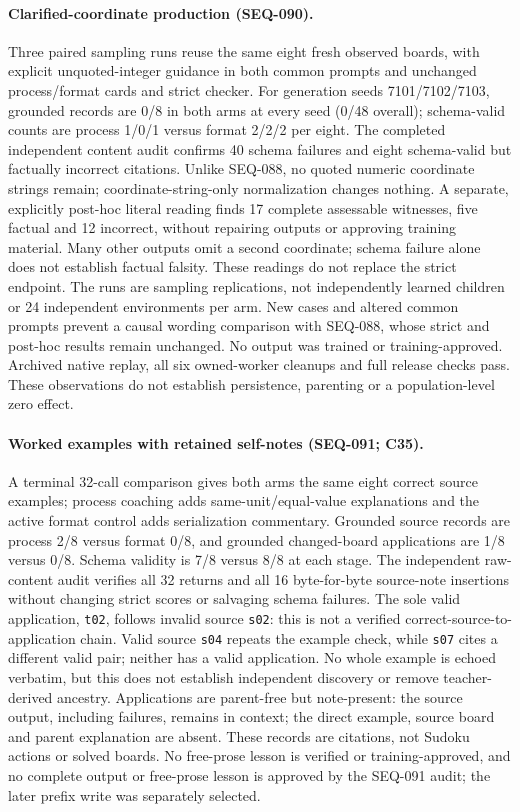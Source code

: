 \documentclass{article}
\begin{document}
\paragraph{Clarified-coordinate production (SEQ-090).} Three paired sampling runs reuse the same eight fresh observed boards, with explicit unquoted-integer guidance in both common prompts and unchanged process/format cards and strict checker. For generation seeds 7101/7102/7103, grounded records are 0/8 in both arms at every seed (0/48 overall); schema-valid counts are process 1/0/1 versus format 2/2/2 per eight. The completed independent content audit confirms 40 schema failures and eight schema-valid but factually incorrect citations. Unlike SEQ-088, no quoted numeric coordinate strings remain; coordinate-string-only normalization changes nothing. A separate, explicitly post-hoc literal reading finds 17 complete assessable witnesses, five factual and 12 incorrect, without repairing outputs or approving training material. Many other outputs omit a second coordinate; schema failure alone does not establish factual falsity. These readings do not replace the strict endpoint. The runs are sampling replications, not independently learned children or 24 independent environments per arm. New cases and altered common prompts prevent a causal wording comparison with SEQ-088, whose strict and post-hoc results remain unchanged. No output was trained or training-approved. Archived native replay, all six owned-worker cleanups and full release checks pass. These observations do not establish persistence, parenting or a population-level zero effect.

\paragraph{Worked examples with retained self-notes (SEQ-091; C35).} A terminal 32-call comparison gives both arms the same eight correct source examples; process coaching adds same-unit/equal-value explanations and the active format control adds serialization commentary. Grounded source records are process 2/8 versus format 0/8, and grounded changed-board applications are 1/8 versus 0/8. Schema validity is 7/8 versus 8/8 at each stage. The independent raw-content audit verifies all 32 returns and all 16 byte-for-byte source-note insertions without changing strict scores or salvaging schema failures. The sole valid application, \texttt{t02}, follows invalid source \texttt{s02}: this is not a verified correct-source-to-application chain. Valid source \texttt{s04} repeats the example check, while \texttt{s07} cites a different valid pair; neither has a valid application. No whole example is echoed verbatim, but this does not establish independent discovery or remove teacher-derived ancestry. Applications are parent-free but note-present: the source output, including failures, remains in context; the direct example, source board and parent explanation are absent. These records are citations, not Sudoku actions or solved boards. No free-prose lesson is verified or training-approved, and no complete output or free-prose lesson is approved by the SEQ-091 audit; the later prefix write was separately selected.
\end{document}
